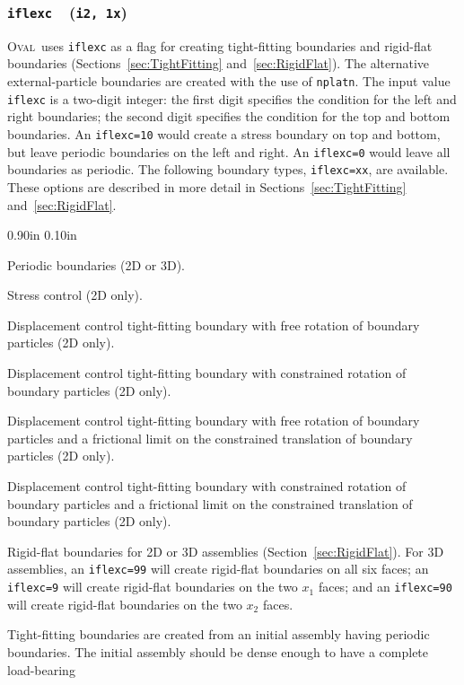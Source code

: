 \documentclass[letterpaper,11pt]{article}
\newcommand{\Oval}{\textsc{Oval}}
\newcommand{\Var}[2]{\texttt{#1}\ \  (\texttt{#2})}
\newlength{\Labelwidth}
\newcommand{\Entrylabel}[1]{\makebox[\Labelwidth][r]{\texttt{#1}}}
\newenvironment{Options}
{\begin{list}{}{%
\renewcommand{\makelabel}{\Entrylabel}%
\setlength{\leftmargin} {0.90in}%
\setlength{\rightmargin}{0.00in}%
\setlength{\labelsep}   {0.10in}%
\setlength{\labelwidth} {\Labelwidth}%
}}
{\end{list}}
\begin{document}
\subsubsection[\texttt{iflexc}]{\Var{iflexc}{i2, 1x}}\label{sec:iflexc}
\Oval\ uses \texttt{iflexc} as a flag for creating 
tight-fitting boundaries and rigid-flat boundaries
(Sections~\ref{sec:TightFitting} and~\ref{sec:RigidFlat}).
The alternative external-particle boundaries are created with the
use of \texttt{nplatn}.
The input value \texttt{iflexc} is a two-digit integer: the first
digit specifies the condition for the left and right boundaries;
the second digit specifies the condition for the top and bottom
boundaries.  An \texttt{iflexc=10} would create a stress boundary
on top and bottom, but leave periodic boundaries on the left and right.
An \texttt{iflexc=0} would leave all boundaries as periodic.
The following boundary types, \texttt{iflexc=xx}, are available.
These options are described in more detail in 
Sections~\ref{sec:TightFitting} and~\ref{sec:RigidFlat}.
\begin{Options}
\item[iflexc=0]
Periodic boundaries (2D or 3D).
\item[iflexc=1]
Stress control (2D only).
\item[iflexc=2]
Displacement control tight-fitting boundary
with free rotation of boundary particles
(2D only).
\item[iflexc=3]
Displacement control tight-fitting boundary
with constrained rotation of boundary particles
(2D only).
\item[iflexc=4]
Displacement control tight-fitting boundary
with free rotation of boundary particles
and a frictional limit on the constrained translation of boundary particles
(2D only).
\item[iflexc=5]
Displacement control tight-fitting boundary
with constrained rotation of boundary particles
and a frictional limit on the constrained translation of boundary particles
(2D only).
\item[iflexc=9]
Rigid-flat boundaries for 2D or 3D assemblies (Section~\ref{sec:RigidFlat}).
For 3D assemblies, an \texttt{iflexc=99} will create rigid-flat
boundaries on all six faces;
an \texttt{iflexc=9} will create rigid-flat boundaries on the two
$x_{1}$ faces;
and an \texttt{iflexc=90} will create rigid-flat boundaries on the two
$x_{2}$ faces.
\end{Options}
Tight-fitting boundaries are created from an initial assembly having
periodic boundaries.
The initial assembly should be dense enough to have a complete load-bearing
\end{document}
